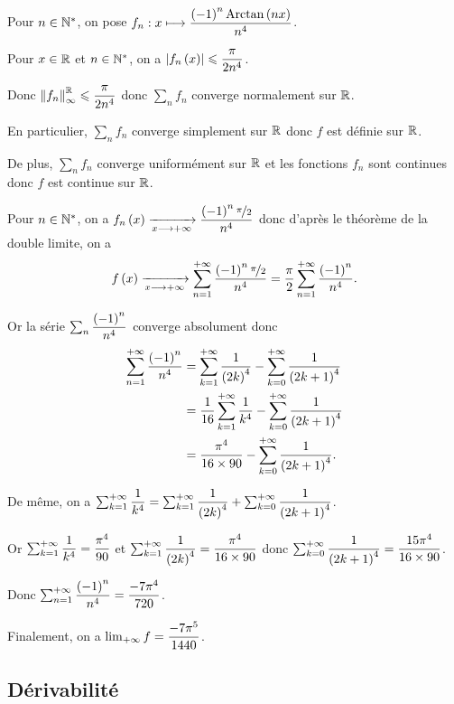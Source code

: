 \begin{corr}
Pour \(n\in\mathbb{N}^*\), on pose \(f_n:x\longmapsto\dfrac{\left(-1\right)^n\operatorname{Arctan}\left(nx\right)}{n^4}\).

Pour \(x\in\mathbb{R}\) et \(n\in\mathbb{N}^*\), on a \(\left\lvert f_n\left(x\right)\right\rvert\leqslant\dfrac{\pi}{2n^4}\).

Donc \(\norme{f_n}_\infty^\R\leq\dfrac{\pi}{2n^4}\) donc \(\sum_nf_n\) converge normalement sur \(\mathbb{R}\).

En particulier, \(\sum_nf_n\) converge simplement sur \(\mathbb{R}\) donc \(f\) est définie sur \(\mathbb{R}\).

De plus, \(\sum_nf_n\) converge uniformément sur \(\mathbb{R}\) et les fonctions \(f_n\) sont continues donc \(f\) est continue sur \(\mathbb{R}\).

Pour \(n\in\mathbb{N}^*\), on a \(f_n\left(x\right)\xrightarrow[x\longrightarrow+\infty]{}\dfrac{\left(-1\right)^n\nicefrac{\pi}{2}}{n^4}\) donc d'après le théorème de la double limite, on a \[f\left(x\right)\xrightarrow[x\longrightarrow+\infty]{}\sum_{n=1}^{+\infty}\dfrac{\left(-1\right)^n\nicefrac{\pi}{2}}{n^4}=\dfrac{\pi}{2}\sum_{n=1}^{+\infty}\dfrac{\left(-1\right)^n}{n^4}.\]

Or la série \(\sum_n\dfrac{\left(-1\right)^n}{n^4}\) converge absolument donc \[\begin{aligned}
\sum_{n=1}^{+\infty}\dfrac{\left(-1\right)^n}{n^4}&=\sum_{k=1}^{+\infty}\dfrac{1}{\left(2k\right)^4}-\sum_{k=0}^{+\infty}\dfrac{1}{\left(2k+1\right)^4} \\
&=\dfrac{1}{16}\sum_{k=1}^{+\infty}\dfrac{1}{k^4}-\sum_{k=0}^{+\infty}\dfrac{1}{\left(2k+1\right)^4} \\
&=\dfrac{\pi^4}{16\times90}-\sum_{k=0}^{+\infty}\dfrac{1}{\left(2k+1\right)^4}.
\end{aligned}\]

De même, on a \(\sum_{k=1}^{+\infty}\dfrac{1}{k^4}=\sum_{k=1}^{+\infty}\dfrac{1}{\left(2k\right)^4}+\sum_{k=0}^{+\infty}\dfrac{1}{\left(2k+1\right)^4}\).

Or \(\sum_{k=1}^{+\infty}\dfrac{1}{k^4}=\dfrac{\pi^4}{90}\) et \(\sum_{k=1}^{+\infty}\dfrac{1}{\left(2k\right)^4}=\dfrac{\pi^4}{16\times90}\) donc \(\sum_{k=0}^{+\infty}\dfrac{1}{\left(2k+1\right)^4}=\dfrac{15\pi^4}{16\times90}\).

Donc \(\sum_{n=1}^{+\infty}\dfrac{\left(-1\right)^n}{n^4}=\dfrac{-7\pi^4}{720}\).

Finalement, on a \(\lim_{+\infty}f=\dfrac{-7\pi^5}{1440}\).
\end{corr}

\subsection{Dérivabilité}

